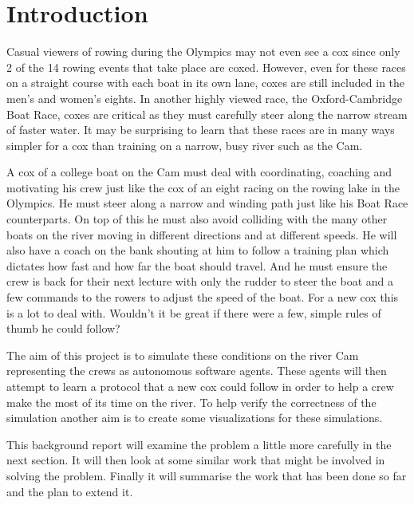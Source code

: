 \chapter{Introduction}
Casual viewers of rowing during the Olympics may not even see a cox
since only 2 of the 14 rowing events that take place are
coxed. 
However, even for these races on a straight course with each boat in its own lane,
coxes are still included in the men's and women's eights.
In another highly viewed race, the Oxford-Cambridge Boat Race, coxes
are critical as they must carefully steer along
the narrow stream of faster water. It may be surprising to learn that these races are in many ways simpler for a cox
than training on a narrow, busy river such as the Cam.

A cox of a college boat on the Cam must deal with coordinating,
coaching and motivating his crew just like the cox of an eight racing
on the rowing lake in the Olympics. He must steer along a narrow and
winding path just like his Boat Race counterparts. On top of this he
must also avoid colliding with the many other boats on the river
moving in different directions and at different speeds. He will also
have a coach on the bank shouting at him to follow a training plan
which dictates how fast and how far the boat should travel. And he
must ensure the crew is back for their next lecture with only the rudder to steer the boat and a few commands to the rowers to adjust the speed of the boat. For a new cox this is a lot to deal with. Wouldn't it be great if there were a few, simple rules of thumb he could follow?

The aim of this project is to simulate these conditions on the river Cam representing the crews as autonomous software agents. These agents will then attempt to learn a protocol that a new cox could follow in order to help a crew make the most of its time on the river. To help verify the correctness of the simulation another aim is to create some visualizations for these simulations.

This background report will examine the problem a little more
carefully in the next section. It will then look at some similar work
that might be involved in solving the problem. Finally it will summarise the work that has been done so far and the plan to extend it.
